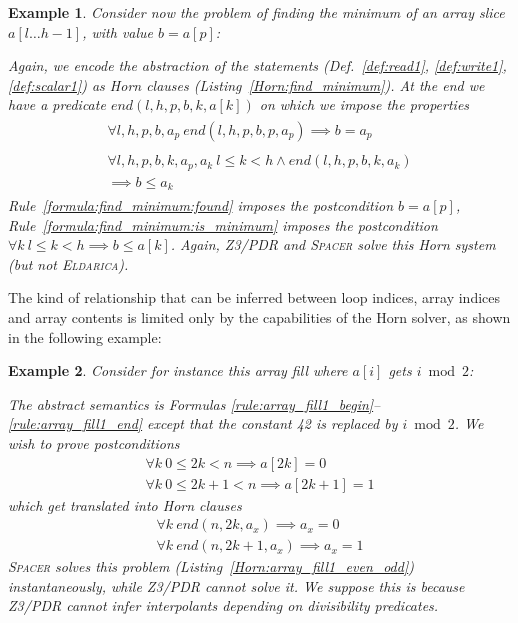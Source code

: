 \documentclass[a4paper]{article}
\newcommand{\soft}[1]{\textsc{#1}}
\theoremstyle{definition}
\theoremstyle{plain}
\newtheorem{example}{Example}
\begin{document}
\begin{example}
Consider now the problem of finding the minimum of an array slice $a[l \dots h-1]$, with value $b=a[p]$:


Again, we encode the abstraction of the statements (Def.~\ref{def:read1}, \ref{def:write1}, \ref{def:scalar1}) as Horn clauses (Listing~\ref{Horn:find_minimum}).
At the end we have a predicate $\mathit{end}(l,h,p,b,k,a[k])$ on which we impose the properties
\begin{align}
\begin{aligned}
\forall l,h,p,b,a_p~ \mathit{end}(l,h,p,b,p,a_p) \implies b = a_p
   \label{formula:find_minimum:found}
\end{aligned} \\
\begin{aligned}
\forall l,h,p,b,k,a_p,a_k~
  l \leq k < h \land \mathit{end}(l,h,p,b,k,a_k) \\ \implies b \leq a_k
   \label{formula:find_minimum:is_minimum}
\end{aligned}
\end{align}
Rule~\ref{formula:find_minimum:found} imposes the postcondition $b = a[p]$, Rule~\ref{formula:find_minimum:is_minimum} imposes the postcondition $\forall k~ l \leq k < h \implies b \leq a[k]$.
Again, \soft{Z3/PDR} and \soft{Spacer} solve this Horn system (but not \soft{Eldarica}).
\end{example}

The kind of relationship that can be inferred between loop indices, array indices and array contents is limited only by the capabilities of the Horn solver, as shown in the following example:

\begin{example}
Consider for instance this array fill where $a[i]$ gets $i \bmod 2$:


The abstract semantics is Formulas \ref{rule:array_fill1_begin}--\ref{rule:array_fill1_end} except that the constant 42 is replaced by $i \bmod 2$.
We wish to prove postconditions
\begin{align}
\forall k~ 0 \leq 2k < n \implies a[2k] = 0\\
\forall k~ 0 \leq 2k+1 < n \implies a[2k+1] = 1
\end{align}
which get translated into Horn clauses
\begin{align}
\forall k~ \mathit{end}(n,2k,a_x) \implies a_x = 0\\
\forall k~ \mathit{end}(n,2k+1,a_x) \implies a_x = 1
\end{align}
\soft{Spacer} solves this problem (Listing~\ref{Horn:array_fill1_even_odd}) instantaneously, while \soft{Z3/PDR} cannot solve it.
We suppose this is because Z3/PDR cannot infer interpolants depending on divisibility predicates.
\end{example}
\end{document}
